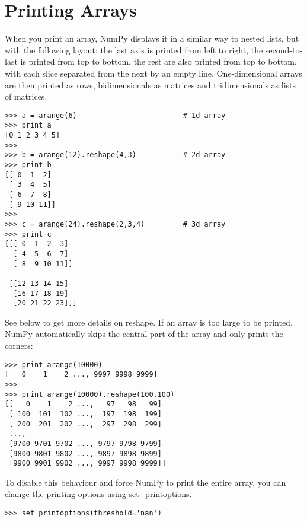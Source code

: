 \section{Printing Arrays}
When you print an array, NumPy displays it in a similar way to nested lists, but with the following layout:
the last axis is printed from left to right,
the second-to-last is printed from top to bottom,
the rest are also printed from top to bottom, with each slice separated from the next by an empty line.
One-dimensional arrays are then printed as rows, bidimensionals as matrices and tridimensionals as lists of matrices.
\begin{verbatim}
>>> a = arange(6)                         # 1d array
>>> print a
[0 1 2 3 4 5]
>>>
>>> b = arange(12).reshape(4,3)           # 2d array
>>> print b
[[ 0  1  2]
 [ 3  4  5]
 [ 6  7  8]
 [ 9 10 11]]
>>>
>>> c = arange(24).reshape(2,3,4)         # 3d array
>>> print c
[[[ 0  1  2  3]
  [ 4  5  6  7]
  [ 8  9 10 11]]

 [[12 13 14 15]
  [16 17 18 19]
  [20 21 22 23]]]
\end{verbatim}
See below to get more details on reshape.
If an array is too large to be printed, NumPy automatically skips the central part of the array and only prints the corners:
\begin{verbatim}
>>> print arange(10000)
[   0    1    2 ..., 9997 9998 9999]
>>>
>>> print arange(10000).reshape(100,100)
[[   0    1    2 ...,   97   98   99]
 [ 100  101  102 ...,  197  198  199]
 [ 200  201  202 ...,  297  298  299]
 ...,
 [9700 9701 9702 ..., 9797 9798 9799]
 [9800 9801 9802 ..., 9897 9898 9899]
 [9900 9901 9902 ..., 9997 9998 9999]]
\end{verbatim}
To disable this behaviour and force NumPy to print the entire array, you can change the printing options using set_printoptions.
\begin{verbatim}
>>> set_printoptions(threshold='nan')
\end{verbatim}
